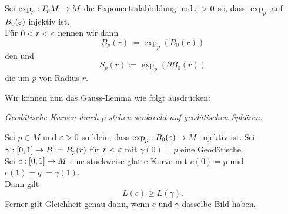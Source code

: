 \Def{}
Sei $\exp_p : T_pM \overset{}{\rightarrow} M$ die Exponentialabbildung und $\varepsilon > 0$ so, dass $\exp_p$ auf $B_0(\varepsilon)$ injektiv ist.\\
Für $0<r<\varepsilon$ nennen wir dann
\[ B_p(r) := \exp_p(B_0(r)) \]
den  und
\[ S_p(r) := \exp_p(\partial B_0(r)) \]
die  um $p$ von Radius $r$.

Wir können nun das Gauss-Lemma wie folgt ausdrücken:
\begin{center}
\emph{
	Geodätische Kurven durch $p$ stehen senkrecht auf geodätischen Sphären.
}	
\end{center}

Sei $p \in M$ und $\varepsilon > 0$ so klein, dass $\exp_p : B_0(\varepsilon) \overset{}{\rightarrow} M$ injektiv ist. Sei $\gamma: [0,1] \overset{}{\rightarrow} B := B_p(r)$ für $r<\varepsilon$ mit $\gamma(0) = p$ eine Geodätische.\\
Sei $c : [0,1] \overset{}{\rightarrow} M$ eine stückweise glatte Kurve mit $c(0) = p$ und $c(1) = q:= \gamma(1)$.\\
Dann gilt
\[ L(c) \geq L(\gamma). \]
Ferner gilt Gleichheit genau dann, wenn $c$ und $\gamma$ dasselbe Bild haben.
